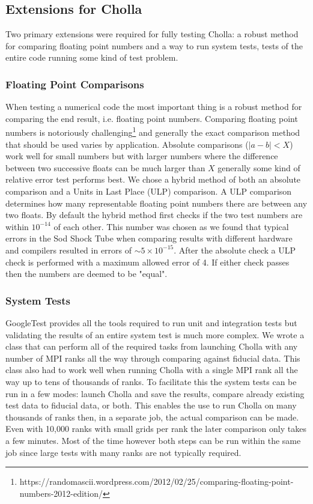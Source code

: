 \subsection{Extensions for Cholla}

Two primary extensions were required for fully testing Cholla: a robust method for comparing floating point numbers and a way to run system tests, tests of the entire code running some kind of test problem.

\subsubsection{Floating Point Comparisons}

When testing a numerical code the most important thing is a robust method for comparing the end result, i.e. floating point numbers. Comparing floating point numbers is notoriously challenging\footnote{https://randomascii.wordpress.com/2012/02/25/comparing-floating-point-numbers-2012-edition/} and generally the exact comparison method that should be used varies by application. Absolute comparisons ($|a-b| < X$) work well for small numbers but with larger numbers where the difference between two successive floats can be much larger than $X$ generally some kind of relative error test performs best. We chose a hybrid method of both an absolute comparison and a Units in Last Place (ULP) comparison. A ULP comparison determines how many representable floating point numbers there are between any two floats. By default the hybrid method first checks if the two test numbers are within $10^{-14}$ of each other. This number was chosen as we found that typical errors in the Sod Shock Tube when comparing results with different hardware and compilers resulted in errors of $\sim5\times10^{-15}$. After the absolute check a ULP check is performed with a maximum allowed error of 4. If either check passes then the numbers are deemed to be "equal".

\subsubsection{System Tests}

GoogleTest provides all the tools required to run unit and integration tests but validating the results of an entire system test is much more complex. We wrote a class that can perform all of the required tasks from launching Cholla with any number of MPI ranks all the way through comparing against fiducial data. This class also had to work well when running Cholla with a single MPI rank all the way up to tens of thousands of ranks. To facilitate this the system tests can be run in a few modes: launch Cholla and save the results, compare already existing test data to fiducial data, or both. This enables the use to run Cholla on many thousands of ranks then, in a separate job, the actual comparison can be made. Even with 10,000 ranks with small grids per rank the later comparison only takes a few minutes. Most of the time however both steps can be run within the same job since large tests with many ranks are not typically required.

